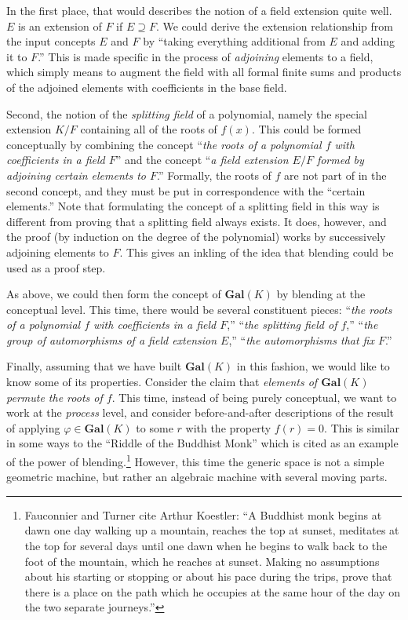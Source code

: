 In the first place, that would describes the notion of a field
extension quite well.  $E$ is an extension of $F$ if $E \supseteq F$.
We could derive the extension relationship from the input concepts $E$
and $F$ by ``taking everything additional from $E$ and adding it to
$F$.''  This is made specific in the process of \emph{adjoining}
elements to a field, which simply means to augment the field with all
formal finite sums and products of the adjoined elements with
coefficients in the base field.

Second, the notion of the \emph{splitting field} of a polynomial,
namely the special extension $K/F$ containing all of the roots of
$f(x)$.  This could be formed conceptually by combining the concept
``\emph{the roots of a polynomial $f$ with coefficients in a field
  $F$}'' and the concept ``\emph{a field extension $E/F$ formed by
  adjoining certain elements to $F$}.''  Formally, the roots of $f$
are not part of in the second concept, and they must be put in
correspondence with the ``certain elements.''  Note that formulating
the concept of a splitting field in this way is different from proving
that a splitting field always exists.  It does, however, and the proof
(by induction on the degree of the polynomial) works by successively
adjoining elements to $F$.  This gives an inkling of the idea that
blending could be used as a proof step.

As above, we could then form the concept of $\mathbf{Gal}(K)$ by blending
at the conceptual level.  This time, there would be several constituent pieces:
``\emph{the roots of a polynomial $f$ with coefficients in a field $F$},''
``\emph{the splitting field of $f$},''
``\emph{the group of automorphisms of a field extension $E$},''
``\emph{the automorphisms that fix $F$}.''

Finally, assuming that we have built $\mathbf{Gal}(K)$ in this
fashion, we would like to know some of its properties.  Consider the
claim that \emph{elements of $\mathbf{Gal}(K)$ permute the roots of
  $f$}.  This time, instead of being purely conceptual, we want to
work at the \emph{process} level, and consider before-and-after
descriptions of the result of applying $\varphi\in\mathbf{Gal}(K)$ to
some $r$ with the property $f(r)=0$.  This is similar in some ways to
the ``Riddle of the Buddhist Monk'' \cite{Fau98} which is cited as
an example of the power of blending.\footnote{Fauconnier and Turner
  cite Arthur Koestler: ``A Buddhist monk begins at dawn one day
  walking up a mountain, reaches the top at sunset, meditates at the
  top for several days until one dawn when he begins to walk back to
  the foot of the mountain, which he reaches at sunset.  Making no
  assumptions about his starting or stopping or about his pace during
  the trips, prove that there is a place on the path which he occupies
  at the same hour of the day on the two separate journeys.''}
However, this time the generic space is not a simple geometric machine,
but rather an algebraic machine with several moving parts.

